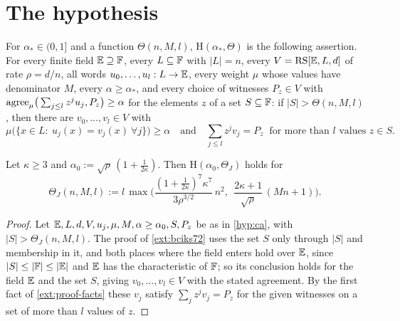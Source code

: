 \section{The hypothesis}

\begin{hypothesis}\label{hyp:ca}
For $\alpha_*\in(0,1]$ and a function $\Theta(n,M,l)$, $\mathrm H(\alpha_*,\Theta)$ is the
following assertion. For every finite field $\mathbb{E}\supseteq\mathbb{F}$, every $L\subseteq\mathbb{F}$ with
$|L|=n$, every $V=\mathrm{RS}[\mathbb{E},L,d]$ of rate $\rho=d/n$, all words $u_0,\dots,u_l:L\to\mathbb{E}$, every
weight $\mu$ whose values have denominator $M$, every $\alpha\ge\alpha_*$, and every choice of
witnesses $P_z\in V$ with $\mathrm{agree}_\mu\big(\sum_{j\le l}z^ju_j,P_z\big)\ge\alpha$ for the
elements $z$ of a set $S\subseteq\mathbb{F}$: if $|S|>\Theta(n,M,l)$, then there are $v_0,\dots,v_l\in V$
with
\[
\mu\big(\{x\in L:\ u_j(x)=v_j(x)\ \forall j\}\big)\ge\alpha
\quad\text{and}\quad
\textstyle\sum_{j\le l}z^jv_j=P_z\ \text{ for more than }l\text{ values }z\in S .
\]
\end{hypothesis}

{\renewcommand{\theproposition}{P-H1}
\begin{proposition}\label{prop:H1}
Let $\kappa\ge3$ and $\alpha_0:=\sqrt\rho\,(1+\frac1{2\kappa})$. Then
$\mathrm H(\alpha_0,\Theta_J)$ holds for
\[
\Theta_J(n,M,l):=l\,\max\Big(\frac{(1+\frac1{2\kappa})^7\kappa^7}{3\rho^{3/2}}\,n^2,\ \
\frac{2\kappa+1}{\sqrt\rho}\,(Mn+1)\Big).
\]
\end{proposition}

\begin{proof}
Let $\mathbb{E},L,d,V,u_j,\mu,M,\alpha\ge\alpha_0,S,P_z$ be as in \ref{hyp:ca}, with
$|S|>\Theta_J(n,M,l)$. The proof of \cref{ext:bciks72} uses the set $S$ only through $|S|$ and
membership in it, and both places where the field enters hold over $\mathbb{E}$, since
$|S|\le|\mathbb{F}|\le|\mathbb{E}|$ and $\mathbb{E}$ has the characteristic of $\mathbb{F}$; so its conclusion holds for the
field $\mathbb{E}$ and the set $S$, giving $v_0,\dots,v_l\in V$ with the stated agreement. By the first
fact of \cref{ext:proof-facts} these $v_j$ satisfy $\sum_jz^jv_j=P_z$ for the given witnesses on
a set of more than $l$ values of $z$.
\end{proof}
}

